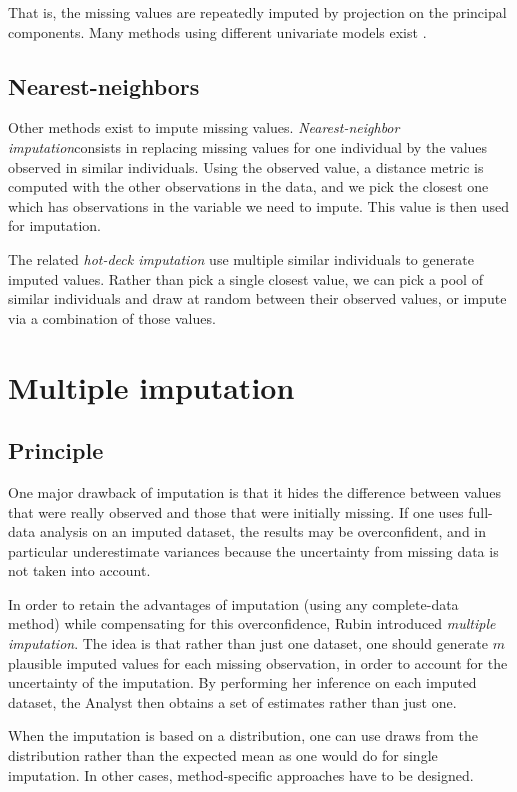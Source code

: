 That is, the missing values are repeatedly imputed by projection on the principal components. Many methods using different univariate models exist \cite{MICE_founding}\cite{stekhoven2015missforest}\cite{van2007multiple}.
		
		\subsection{Nearest-neighbors}
Other methods exist to impute missing values. \emph{Nearest-neighbor imputation}\cite{chen2000nearest}consists in replacing missing values for one individual by the values observed in similar individuals. Using the observed value, a distance metric is computed with the other observations in the data, and we pick the closest one which has observations in the variable we need to impute. This value is then used for imputation.

 The related \emph{hot-deck imputation} \cite{andridge2010hotdeck} use multiple similar individuals to generate imputed values. Rather than pick a single closest value, we can pick a pool of similar individuals and draw at random between their observed values, or impute via a combination of those values.

	\section{Multiple imputation}
		\subsection{Principle}
One major drawback of imputation is that it hides the difference between values that were really observed and those that were initially missing. If one uses full-data analysis on an imputed dataset, the results may be overconfident, and in particular underestimate variances because the uncertainty from missing data is not taken into account.

In order to retain the advantages of imputation (using any complete-data method) while compensating for this overconfidence, Rubin \cite{rubin1986mi_founding} introduced \emph{multiple imputation}. The idea is that rather than just one dataset, one should generate $m$ plausible imputed values for each missing observation, in order to account for the uncertainty of the imputation. By performing her inference on each imputed dataset, the Analyst then obtains a set of estimates rather than just one. 

When the imputation is based on a distribution, one can use draws from the distribution rather than the expected mean as one would do for single imputation. In other cases, method-specific approaches have to be designed.

